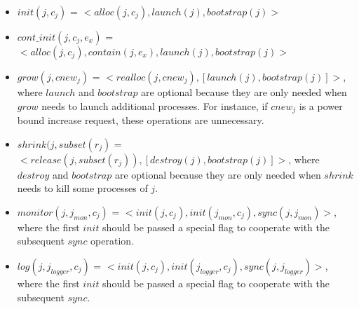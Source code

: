 \begin{itemize}

\item{$init(j, c_j)$ = $<alloc(j, c_j), launch(j), bootstrap(j)>$}

\item{$cont\_init(j, c_j, e_x)$ = $< alloc(j, c_j), contain(j, e_x), launch(j), bootstrap(j) >$}

\item{$grow(j, cnew_j)$ = $<realloc(j, cnew_j), [launch(j), bootstrap(j)]>$,  
where $launch$ and $bootstrap$ are optional because they are only needed when $grow$ needs to launch additional processes. For instance, if $cnew_j$ is a power bound increase request, these operations are unnecessary.}

\item{$shrink(j,subset(r_j)$ = $<release(j, subset(r_j)), [destroy(j), bootstrap(j)]>$, 
where $destroy$ and $bootstrap$ are optional because they are only needed when $shrink$ needs to kill some processes of $j$.}

\item{$monitor(j, j_{mon}, c_j)$ = $<init(j, c_j), init(j_{mon}, c_j), sync(j, j_{mon})>$, where the first $init$ should be passed a special flag to cooperate with the subsequent $sync$ operation.}

\item{$log(j, j_{logger}, c_j)$ = $<init(j, c_j), init(j_{logger}, c_j), sync(j, j_{logger})>$, where the first $init$ should be passed a special flag to cooperate with the subsequent $sync$.}

\end{itemize}

